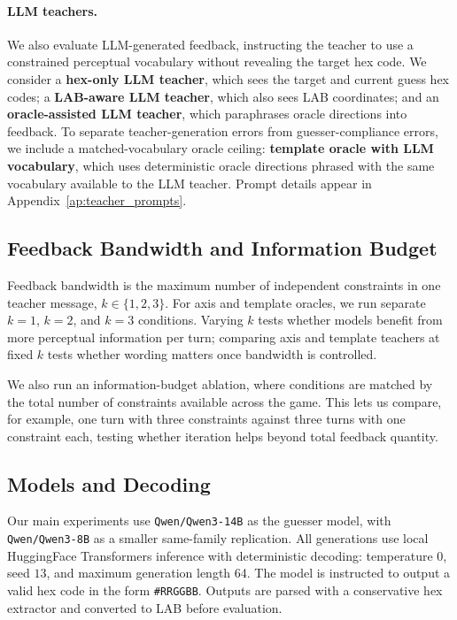 \documentclass[11pt]{article}
\begin{document}
\paragraph{LLM teachers.}
We also evaluate LLM-generated feedback, instructing the teacher to use a
constrained perceptual vocabulary without revealing the target hex code. We
consider a \textbf{hex-only LLM teacher}, which sees the target and current
guess hex codes; a \textbf{LAB-aware LLM teacher}, which also sees LAB
coordinates; and an \textbf{oracle-assisted LLM teacher}, which paraphrases
oracle directions into feedback. To separate teacher-generation errors from
guesser-compliance errors, we include a matched-vocabulary oracle ceiling:
\textbf{template oracle with LLM vocabulary}, which uses deterministic oracle
directions phrased with the same vocabulary available to the LLM teacher.
Prompt details appear in Appendix~\ref{ap:teacher_prompts}.

\subsection{Feedback Bandwidth and Information Budget}
\label{sec:bandwidth_budget}

Feedback bandwidth is the maximum number of independent constraints in one
teacher message, $k \in \{1,2,3\}$. For axis and template oracles, we run
separate $k=1$, $k=2$, and $k=3$ conditions. Varying $k$ tests whether
models benefit from more perceptual information per turn; comparing axis and
template teachers at fixed $k$ tests whether wording matters once bandwidth
is controlled.

We also run an information-budget ablation, where conditions are matched by
the total number of constraints available across the game. This lets us
compare, for example, one turn with three constraints against three turns
with one constraint each, testing whether iteration helps beyond total
feedback quantity.

\subsection{Models and Decoding}
\label{sec:models}

Our main experiments use \texttt{Qwen/Qwen3-14B} \citep{yang2025qwen3} as
the guesser model, with \texttt{Qwen/Qwen3-8B} as a smaller same-family
replication. All generations use local HuggingFace Transformers
\citep{wolf2020transformers} inference with deterministic decoding:
temperature $0$, seed $13$, and maximum generation length 64. The model is
instructed to output a valid hex code in the form \texttt{\#RRGGBB}. Outputs
are parsed with a conservative hex extractor and converted to LAB before
evaluation.
\end{document}
